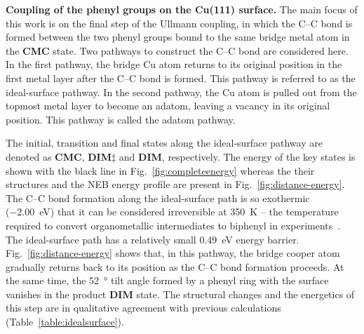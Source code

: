 \documentclass[%
 reprint,
 amsmath,amssymb,
 aps,
prb,
floatfix,
]{revtex4-2}
\newcommand{\lock}{\color{red}}
\newcommand{\lock}{\color{black}}
\begin{document}
{\lock
\textbf{Coupling of the phenyl groups on the Cu(111) surface.} The main focus of this work is on the final step of the Ullmann coupling, in which the C--C bond is formed between the two phenyl groups bound to the same bridge metal atom in the \textbf{CMC} state. 
Two pathways to construct the C--C bond are considered here. 
In the first pathway, the bridge Cu atom returns to its original position in the first metal layer after the C--C bond is formed. This pathway is referred to as the ideal-surface pathway.
In the second pathway, the Cu atom is pulled out from the topmost metal layer to become an adatom, leaving a vacancy in its original position. This pathway is called the adatom pathway.
}

{\lock
The initial, transition and final states along the ideal-surface pathway are denoted as \textbf{CMC}, \textbf{DIM$\ddagger$} and \textbf{DIM}, respectively.
The energy of the key states is shown with the black line in Fig.~\ref{fig:completeenergy} whereas the their structures and the NEB energy profile are present in Fig.~\ref{fig:distance-energy}. 
The C--C bond formation along the ideal-surface path is so exothermic (\SI{-2.00}{\electronvolt}) that it can be considered irreversible at \SI{350}{\kelvin} -- the temperature required to convert organometallic intermediates to biphenyl in experiments~\cite{ullmann_67, sur_sci01}. The ideal-surface path has a relatively small \SI{0.49}{\electronvolt} energy barrier. %
Fig.~\ref{fig:distance-energy} shows that, in this pathway, the bridge cooper atom gradually returns back to its position as the C--C bond formation proceeds. At the same time, the \SI{52}{\degree} tilt angle formed by a phenyl ring with the surface vanishes in the product \textbf{DIM} state.
% 
The structural changes and the energetics of this step are in qualitative agreement with previous calculations (Table~\ref{table:idealsurface}). %

}
\end{document}

